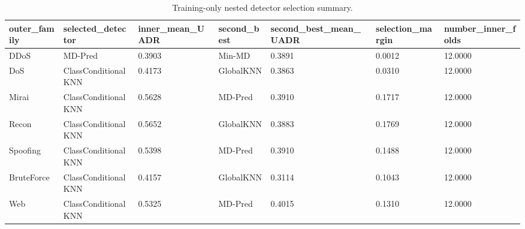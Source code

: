 \begin{table}
\caption{Training-only nested detector selection summary.}
\label{tab:table07_detector_selection}
\begin{tabular}{lllllll}
\toprule
outer\_family & selected\_detector & inner\_mean\_UADR & second\_best & second\_best\_mean\_UADR & selection\_margin & number\_inner\_folds \\
\midrule
DDoS & MD-Pred & 0.3903 & Min-MD & 0.3891 & 0.0012 & 12.0000 \\
DoS & ClassConditionalKNN & 0.4173 & GlobalKNN & 0.3863 & 0.0310 & 12.0000 \\
Mirai & ClassConditionalKNN & 0.5628 & MD-Pred & 0.3910 & 0.1717 & 12.0000 \\
Recon & ClassConditionalKNN & 0.5652 & GlobalKNN & 0.3883 & 0.1769 & 12.0000 \\
Spoofing & ClassConditionalKNN & 0.5398 & MD-Pred & 0.3910 & 0.1488 & 12.0000 \\
BruteForce & ClassConditionalKNN & 0.4157 & GlobalKNN & 0.3114 & 0.1043 & 12.0000 \\
Web & ClassConditionalKNN & 0.5325 & MD-Pred & 0.4015 & 0.1310 & 12.0000 \\
\bottomrule
\end{tabular}
\end{table}
